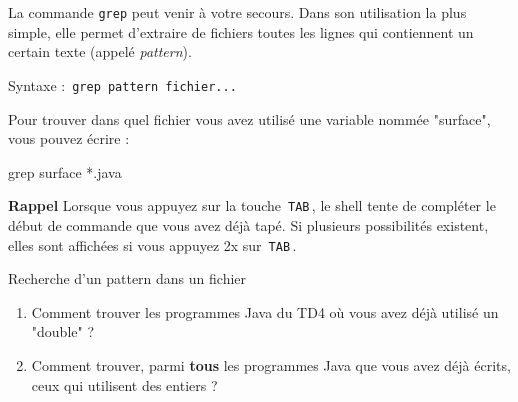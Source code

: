 \documentclass[a4paper,11pt]{article}
\begin{document}
            	\par
        
			
		La commande \verb_grep_ peut venir \`a votre secours. Dans son utilisation la plus simple, elle permet d'extraire de fichiers toutes les lignes qui contiennent un certain texte (appel\'e 
		\textit{pattern}).
					
		\par
		Syntaxe : \,\verb|grep pattern fichier...|\,
                 \par
        
			
				
           	\begin{Exemple}{}
			Pour trouver dans quel fichier vous avez utilis\'e une variable nomm\'ee "surface", vous pouvez \'ecrire :
				\begin{Console}
					grep surface *.java
				\end{Console}
		\end{Exemple}
            \par
        

        
			\textbf{Rappel} Lorsque vous appuyez sur la touche \,\verb|TAB|\,,
			le shell tente de compl\'eter le d\'ebut de commande que vous avez
			d\'ej\`a tap\'e.  Si plusieurs possibilit\'es existent, elles sont
			affich\'ees si vous appuyez 2x sur  \,\verb|TAB|\,.  
        
            	\par
        
			
		\begin{Exercice}{Recherche d'un pattern dans un fichier} 
			\begin{enumerate}
				\item Comment trouver les programmes Java du TD4 o\`u vous avez d\'ej\`a utilis\'e un "double" ?
		 
		 		\item Comment trouver, parmi \textbf{tous} les programmes Java que vous avez d\'ej\`a \'ecrits, ceux qui utilisent des entiers ?
			\end{enumerate}
			\par\medskip
            \par

		\end{Exercice}		
\end{document}
